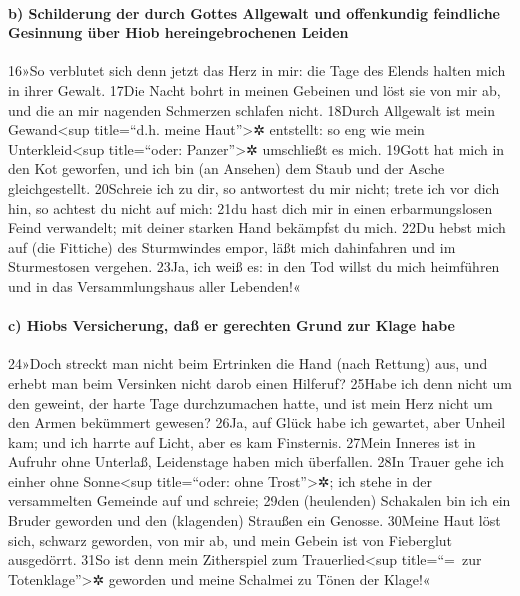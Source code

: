 \hypertarget{b-schilderung-der-durch-gottes-allgewalt-und-offenkundig-feindliche-gesinnung-uxfcber-hiob-hereingebrochenen-leiden}{%
\paragraph{b) Schilderung der durch Gottes Allgewalt und offenkundig
feindliche Gesinnung über Hiob hereingebrochenen
Leiden}\label{b-schilderung-der-durch-gottes-allgewalt-und-offenkundig-feindliche-gesinnung-uxfcber-hiob-hereingebrochenen-leiden}}

16»So verblutet sich denn jetzt das Herz in mir: die Tage des Elends
halten mich in ihrer Gewalt. 17Die Nacht bohrt in meinen Gebeinen und
löst sie von mir ab, und die an mir nagenden Schmerzen schlafen nicht.
18Durch Allgewalt ist mein Gewand\textless sup title=``d.h. meine
Haut''\textgreater✲ entstellt: so eng wie mein Unterkleid\textless sup
title=``oder: Panzer''\textgreater✲ umschließt es mich. 19Gott hat mich
in den Kot geworfen, und ich bin (an Ansehen) dem Staub und der Asche
gleichgestellt. 20Schreie ich zu dir, so antwortest du mir nicht; trete
ich vor dich hin, so achtest du nicht auf mich: 21du hast dich mir in
einen erbarmungslosen Feind verwandelt; mit deiner starken Hand
bekämpfst du mich. 22Du hebst mich auf (die Fittiche) des Sturmwindes
empor, läßt mich dahinfahren und im Sturmestosen vergehen. 23Ja, ich
weiß es: in den Tod willst du mich heimführen und in das
Versammlungshaus aller Lebenden!«

\hypertarget{c-hiobs-versicherung-dauxdf-er-gerechten-grund-zur-klage-habe}{%
\paragraph{c) Hiobs Versicherung, daß er gerechten Grund zur Klage
habe}\label{c-hiobs-versicherung-dauxdf-er-gerechten-grund-zur-klage-habe}}

24»Doch streckt man nicht beim Ertrinken die Hand (nach Rettung) aus,
und erhebt man beim Versinken nicht darob einen Hilferuf? 25Habe ich
denn nicht um den geweint, der harte Tage durchzumachen hatte, und ist
mein Herz nicht um den Armen bekümmert gewesen? 26Ja, auf Glück habe ich
gewartet, aber Unheil kam; und ich harrte auf Licht, aber es kam
Finsternis. 27Mein Inneres ist in Aufruhr ohne Unterlaß, Leidenstage
haben mich überfallen. 28In Trauer gehe ich einher ohne
Sonne\textless sup title=``oder: ohne Trost''\textgreater✲; ich stehe in
der versammelten Gemeinde auf und schreie; 29den (heulenden) Schakalen
bin ich ein Bruder geworden und den (klagenden) Straußen ein Genosse.
30Meine Haut löst sich, schwarz geworden, von mir ab, und mein Gebein
ist von Fieberglut ausgedörrt. 31So ist denn mein Zitherspiel zum
Trauerlied\textless sup title=``=~zur Totenklage''\textgreater✲ geworden
und meine Schalmei zu Tönen der Klage!«

